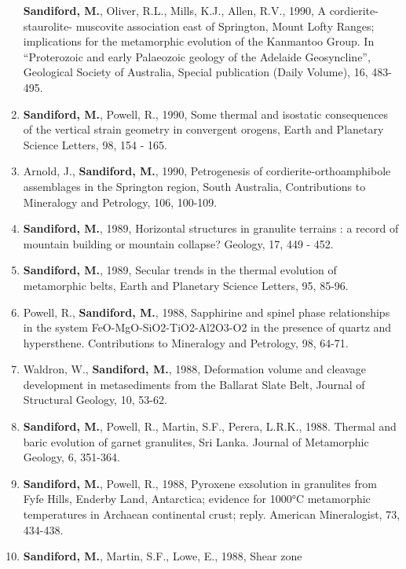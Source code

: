\documentclass[
]{article}
\begin{document}
\begin{enumerate}
  \textbf{Sandiford, M.}, Oliver, R.L., Mills, K.J., Allen, R.V., 1990,
  A cordierite-staurolite- muscovite association east of Springton,
  Mount Lofty Ranges; implications for the metamorphic evolution of the
  Kanmantoo Group. In ``Proterozoic and early Palaeozoic geology of the
  Adelaide Geosyncline'', Geological Society of Australia, Special
  publication (Daily Volume), 16, 483-495.
\item
  \textbf{Sandiford, M.}, Powell, R., 1990, Some thermal and isostatic
  consequences of the vertical strain geometry in convergent orogens,
  Earth and Planetary Science Letters, 98, 154 - 165.
\item
  Arnold, J., \textbf{Sandiford, M.}, 1990, Petrogenesis of
  cordierite-orthoamphibole assemblages in the Springton region, South
  Australia, Contributions to Mineralogy and Petrology, 106, 100-109.
\item
  \textbf{Sandiford, M.}, 1989, Horizontal structures in granulite
  terrains : a record of mountain building or mountain collapse?
  Geology, 17, 449 - 452. 
\item
  \textbf{Sandiford, M.}, 1989, Secular trends in the thermal evolution
  of metamorphic belts, Earth and Planetary Science Letters, 95, 85-96.
\item
  Powell, R., \textbf{Sandiford, M.}, 1988, Sapphirine and spinel phase
  relationships in the system FeO-MgO-SiO2-TiO2-Al2O3-O2 in the presence
  of quartz and hypersthene. Contributions to Mineralogy and Petrology,
  98, 64-71.
\item
  Waldron, W., \textbf{Sandiford, M.}, 1988, Deformation volume and
  cleavage development in metasediments from the Ballarat Slate Belt,
  Journal of Structural Geology, 10, 53-62.
\item
  \textbf{Sandiford, M.}, Powell, R., Martin, S.F., Perera, L.R.K.,
  1988. Thermal and baric evolution of garnet granulites, Sri Lanka.
  Journal of Metamorphic Geology, 6, 351-364.
\item
  \textbf{Sandiford, M.}, Powell, R., 1988, Pyroxene exsolution in
  granulites from Fyfe Hills, Enderby Land, Antarctica; evidence for
  1000°C metamorphic temperatures in Archaean continental crust; reply.
  American Mineralogist, 73, 434-438.
\item
  \textbf{Sandiford, M.}, Martin, S.F., Lowe, E., 1988, Shear zone

\end{enumerate}
\end{document}
